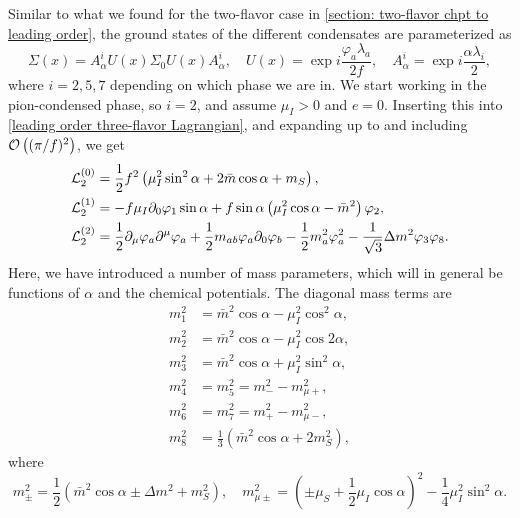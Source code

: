 Similar to what we found for the two-flavor case in \autoref{section: two-flavor chpt to leading order}, the ground states of the different condensates are parameterized as
%
\begin{equation}
    \Sigma(x) = A^i_\alpha U(x) \Sigma_0 U(x) A^i_\alpha, \quad
    U(x) = \exp{i \frac{\varphi_a \lambda_a}{2 f}}, \quad
    A_\alpha^i = \exp{i \frac{\alpha \lambda_i}{2}},
\end{equation}
%
where $i = 2, 5, 7$ depending on which phase we are in.
We start working in the pion-condensed phase, so $i = 2$, and assume $\mu_I > 0$ and $e = 0$.
Inserting this into \autoref{leading order three-flavor Lagrangian}, and expanding up to and including $\mathcal O\left((\pi/f)^2\right)$, we get
%
\begin{align}
    \label{static three-flavor Lagrangian}
    \mathcal{L}_2^{(0)} 
    &=
    \frac{1}{2} f^2
    \left(
        \mu_I^2 \sin^2\alpha
        + 2\bar m \cos\alpha
        + m_S
    \right), \\
    \label{linear three-flavor Lagrangian}
    \mathcal{L}_2^{(1)}
    &=
    -f \mu_I \partial_0 \varphi_1 \sin\alpha
    + f \sin\alpha
    \left(
        \mu_I^2\cos\alpha - \bar m^2
    \right)\varphi_2, \\
    \label{quadratic three-flavor Lagrangian}
    \mathcal{L}_2^{(2)} 
    &= 
    \frac{1}{2}\partial_\mu \varphi_a \partial^\mu \varphi_a
    + \frac{1}{2} m_{ab} \varphi_a\partial_0\varphi_b
    - \frac{1}{2} m_a^2 \varphi_a^2
    - \frac{1}{\sqrt{3}} \Delta m^2 \varphi_3 \varphi_8.
\end{align}
%
Here, we have introduced a number of mass parameters, which will in general be functions of $\alpha$ and the chemical potentials.
The diagonal mass terms are
%
\begingroup
\allowdisplaybreaks
\begin{align}
    \label{m1}
    m_1^2 &=  \bar m^2\cos\alpha - \mu_I^2 \cos^2\alpha,\\
    m_2^2 &= \bar m^2\cos\alpha - \mu_I^2 \cos2\alpha, \\
    m_3^2 &= \bar m^2\cos\alpha + \mu_I^2 \sin^2\alpha, \\
    m_4^2 &= m_5^2 = m_-^2 - m_{\mu+}^2, \\
    m_6^2 &= m_7^2 = m_+^2 - m^2_{\mu-}, \\
    \label{m8}
    m_8^2 &= \frac{1}{3} (\bar m^2 \cos\alpha + 2 m_S^2),
\end{align}
\endgroup
%
where
%
\begin{equation}
    \label{mass terms in pion condensate}
    m_\pm^2 = \frac{1}{2} (\bar m^2 \cos\alpha \pm \Delta m^2 + m_S^2),
    \quad
    m^2_{\mu\pm } = \left(\pm \mu_S + \frac{1}{2}\mu_I\cos\alpha \right)^2 
    - \frac{1}{4}\mu_I^2 \sin^2\alpha.
\end{equation}
